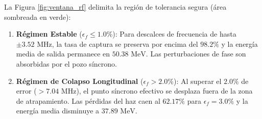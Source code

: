 La Figura \ref{fig:ventana_rf} delimita la región de tolerancia segura (área sombreada en verde):
\begin{enumerate}
    \item \textbf{Régimen Estable} ($\epsilon_f \le 1.0\%$): Para descalces de frecuencia de hasta $\pm 3.52\text{ MHz}$, la tasa de captura se preserva por encima del $98.2\%$ y la energía media de salida permanece en $50.38\text{ MeV}$. Las perturbaciones de fase son absorbidas por el pozo síncrono.
    \item \textbf{Régimen de Colapso Longitudinal} ($\epsilon_f > 2.0\%$): Al superar el $2.0\%$ de error ($>7.04\text{ MHz}$), el punto síncrono efectivo se desplaza fuera de la zona de atrapamiento. Las pérdidas del haz caen al $62.17\%$ para $\epsilon_f = 3.0\%$ y la energía media disminuye a $37.89\text{ MeV}$.
\end{enumerate}